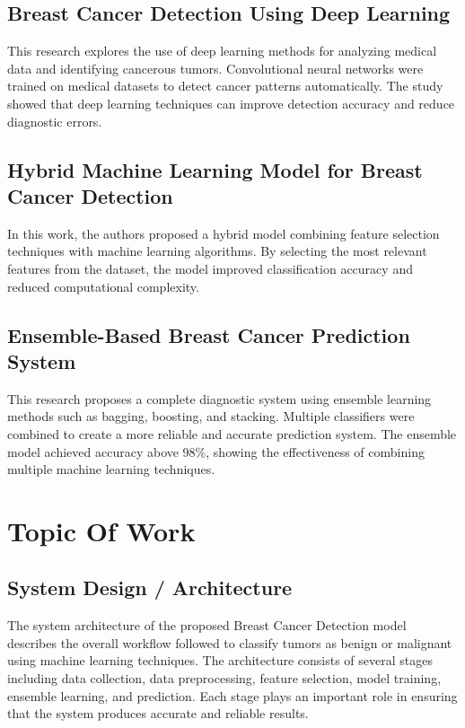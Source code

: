 \documentclass[12pt]{article}
\begin{document}
\subsection{Breast Cancer Detection Using Deep Learning}

This research explores the use of deep learning methods for analyzing medical data and identifying cancerous tumors. Convolutional neural networks were trained on medical datasets to detect cancer patterns automatically. The study showed that deep learning techniques can improve detection accuracy and reduce diagnostic errors.

\subsection{Hybrid Machine Learning Model for Breast Cancer Detection}

In this work, the authors proposed a hybrid model combining feature selection techniques with machine learning algorithms. By selecting the most relevant features from the dataset, the model improved classification accuracy and reduced computational complexity.

\subsection{Ensemble-Based Breast Cancer Prediction System}

This research proposes a complete diagnostic system using ensemble learning methods such as bagging, boosting, and stacking. Multiple classifiers were combined to create a more reliable and accurate prediction system. The ensemble model achieved accuracy above 98\%, showing the effectiveness of combining multiple machine learning techniques.

\newpage
\section{Topic Of Work}

\subsection{System Design / Architecture}

The system architecture of the proposed Breast Cancer Detection model describes the overall workflow followed to classify tumors as benign or malignant using machine learning techniques. The architecture consists of several stages including data collection, data preprocessing, feature selection, model training, ensemble learning, and prediction. Each stage plays an important role in ensuring that the system produces accurate and reliable results.
\end{document}
